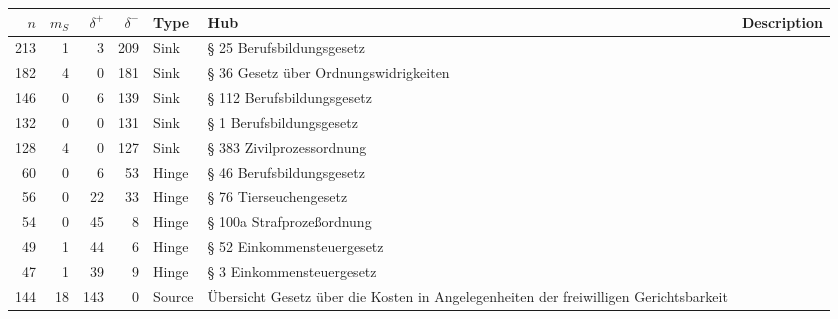 \begin{tabular}{rrrrlp{}p{}}
\hline
   $n$ &   $m_S$ &   $\delta^+$ &   $\delta^-$ & \textbf{Type}   & \textbf{Hub}                                                                         & \textbf{Description}   \\
\hline
   213 &       1 &            3 &          209 & Sink            & § 25 Berufsbildungsgesetz                                                            &                        \\
   182 &       4 &            0 &          181 & Sink            & § 36 Gesetz über Ordnungswidrigkeiten                                                &                        \\
   146 &       0 &            6 &          139 & Sink            & § 112 Berufsbildungsgesetz                                                           &                        \\
   132 &       0 &            0 &          131 & Sink            & § 1 Berufsbildungsgesetz                                                             &                        \\
   128 &       4 &            0 &          127 & Sink            & § 383 Zivilprozessordnung                                                            &                        \\
    60 &       0 &            6 &           53 & Hinge           & § 46 Berufsbildungsgesetz                                                            &                        \\
    56 &       0 &           22 &           33 & Hinge           & § 76 Tierseuchengesetz                                                               &                        \\
    54 &       0 &           45 &            8 & Hinge           & § 100a Strafprozeßordnung                                                            &                        \\
    49 &       1 &           44 &            6 & Hinge           & § 52 Einkommensteuergesetz                                                           &                        \\
    47 &       1 &           39 &            9 & Hinge           & § 3 Einkommensteuergesetz                                                            &                        \\
   144 &      18 &          143 &            0 & Source          & Übersicht Gesetz über die Kosten in Angelegenheiten der freiwilligen Gerichtsbarkeit &                        \\

\end{tabular}
